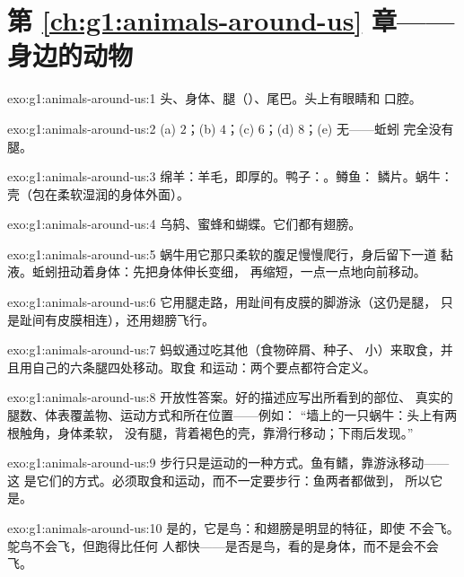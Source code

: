 \section*{第 \ref{ch:g1:animals-around-us} 章——身边的动物}

\begin{solution}{exo:g1:animals-around-us:1}
头、身体、腿（）、尾巴。头上有眼睛和
口腔。
\end{solution}

\begin{solution}{exo:g1:animals-around-us:2}
(a) $2$；(b) $4$；(c) $6$；(d) $8$；(e) 无——蚯蚓
完全没有腿。
\end{solution}

\begin{solution}{exo:g1:animals-around-us:3}
绵羊：羊毛，即厚的。鸭子：。鳟鱼：
鳞片。蜗牛：壳（包在柔软湿润的身体外面）。
\end{solution}

\begin{solution}{exo:g1:animals-around-us:4}
乌鸫、蜜蜂和蝴蝶。它们都有翅膀。
\end{solution}

\begin{solution}{exo:g1:animals-around-us:5}
蜗牛用它那只柔软的腹足慢慢爬行，身后留下一道
黏液。蚯蚓扭动着身体：先把身体伸长变细，
再缩短，一点一点地向前移动。
\end{solution}

\begin{solution}{exo:g1:animals-around-us:6}
它用腿走路，用趾间有皮膜的脚游泳（这仍是腿，
只是趾间有皮膜相连），还用翅膀飞行。
\end{solution}

\begin{solution}{exo:g1:animals-around-us:7}
蚂蚁通过吃其他（食物碎屑、种子、
小）来取食，并且用自己的六条腿四处移动。取食
和运动：两个要点都符合定义。
\end{solution}

\begin{solution}{exo:g1:animals-around-us:8}
开放性答案。好的描述应写出所看到的部位、
真实的腿数、体表覆盖物、运动方式和所在位置——例如：
“墙上的一只蜗牛：头上有两根触角，身体柔软，
没有腿，背着褐色的壳，靠滑行移动；下雨后发现。”
\end{solution}

\begin{solution}{exo:g1:animals-around-us:9}
步行只是运动的一种方式。鱼有鳍，靠游泳移动——这
是它们的方式。必须取食和运动，而不一定要步行：鱼两者都做到，
所以它是。
\end{solution}

\begin{solution}{exo:g1:animals-around-us:10}
是的，它是鸟：和翅膀是明显的特征，即使
不会飞。鸵鸟不会飞，但跑得比任何
人都快——是否是鸟，看的是身体，而不是会不会飞。
\end{solution}
